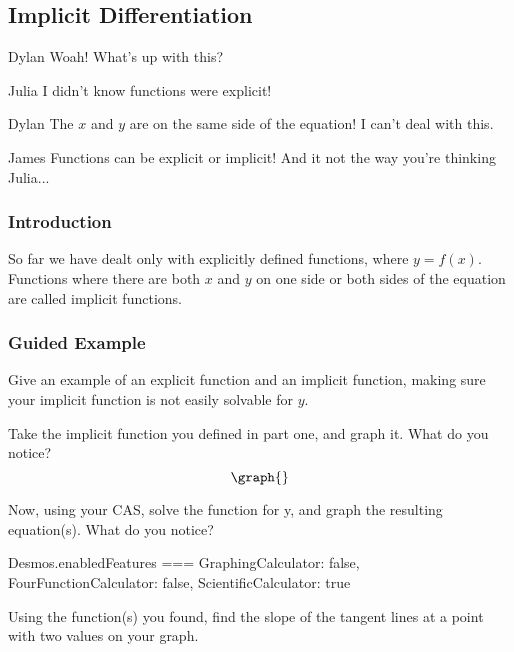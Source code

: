 \documentclass{ximera}
\begin{document}
\subsection{Implicit Differentiation}
\begin{dialogue}
\item[Dylan] Woah! What's up with this?
\item[Julia] I didn't know functions were explicit!
\item[Dylan] The $x$ and $y$ are on the same side of the equation! I can't deal with this.
\item[James] Functions can be explicit or implicit! And it not the way you're thinking Julia...
\end{dialogue}
\subsubsection{Introduction}
So far we have dealt only with explicitly defined functions, where $y=f(x)$.  Functions where there are both $x$ and $y$ on one side or both sides of the equation are called implicit functions.
\subsubsection{Guided Example}
\begin{question}
Give an example of an explicit function and an implicit function, making sure your implicit function is not easily solvable for $y$.
\begin{freeResponse}
\end{freeResponse}
\end{question}
\begin{question}
Take the implicit function you defined in part one, and graph it. What do you notice?
\[
\graph{}
\]
\begin{freeResponse}
\end{freeResponse}
\end{question}
Now, using your CAS, solve the function for y, and graph the resulting equation(s). What do you notice?
\begin{javascript}
Desmos.enabledFeatures === {
  GraphingCalculator: false,
  FourFunctionCalculator: false,
  ScientificCalculator: true
}
\end{javascript}

Using the function(s) you found, find the slope of the tangent lines at a point with two values on your graph.
\end{document}
